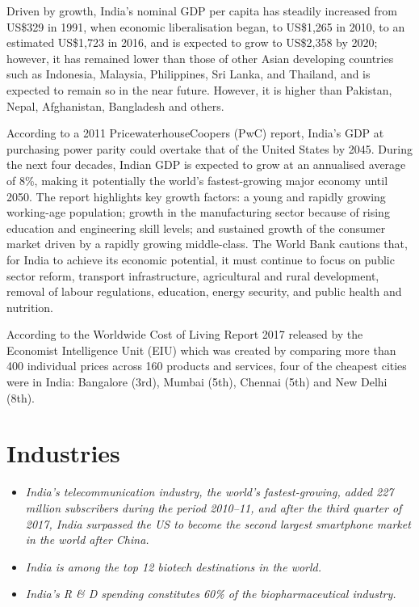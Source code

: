 Driven by growth, India's nominal GDP per capita has steadily increased
from US\$329 in 1991, when economic liberalisation began, to US\$1,265
in 2010, to an estimated US\$1,723 in 2016, and is expected to grow to
US\$2,358 by 2020; however, it has remained lower than those of other
Asian developing countries such as Indonesia, Malaysia, Philippines, Sri
Lanka, and Thailand, and is expected to remain so in the near future.
However, it is higher than Pakistan, Nepal, Afghanistan, Bangladesh and
others.

According to a 2011 PricewaterhouseCoopers (PwC) report, India's GDP at
purchasing power parity could overtake that of the United States by
2045. During the next four decades, Indian GDP is expected to grow at an
annualised average of 8\%, making it potentially the world's
fastest-growing major economy until 2050. The report highlights key
growth factors: a young and rapidly growing working-age population;
growth in the manufacturing sector because of rising education and
engineering skill levels; and sustained growth of the consumer market
driven by a rapidly growing middle-class. The World Bank cautions that,
for India to achieve its economic potential, it must continue to focus
on public sector reform, transport infrastructure, agricultural and
rural development, removal of labour regulations, education, energy
security, and public health and nutrition.

According to the Worldwide Cost of Living Report 2017 released by the
Economist Intelligence Unit (EIU) which was created by comparing more
than 400 individual prices across 160 products and services, four of the
cheapest cities were in India: Bangalore (3rd), Mumbai (5th), Chennai
(5th) and New Delhi (8th).

\section{Industries}\label{industries}

\begin{itemize}
\item
  \emph{India's telecommunication industry, the world's fastest-growing,
  added 227 million subscribers during the period 2010--11, and after
  the third quarter of 2017, India surpassed the US to become the second
  largest smartphone market in the world after China.}
\item
  \emph{India is among the top 12 biotech destinations in the world.}
\item
  \emph{India's R \& D spending constitutes 60\% of the
  biopharmaceutical industry.}
\end{itemize}

